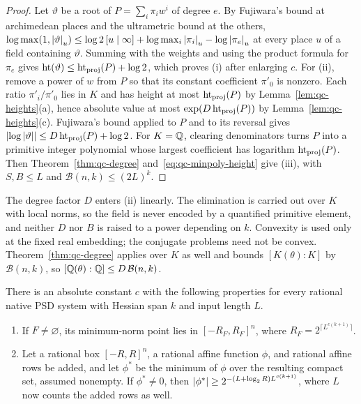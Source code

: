 \begin{proof}
Let $\vartheta$ be a root of $P=\sum_i\pi_iw^i$ of degree $e$. By Fujiwara's
bound at archimedean places and the ultrametric bound at the others,
$\log\max(1,\left\lvert\vartheta\right\rvert_u)\le\log2\,[u\mid\infty]+
\log\max_i\left\lvert\pi_i\right\rvert_u-\log\left\lvert\pi_e\right\rvert_u$ at every place $u$ of a field
containing $\vartheta$. Summing with the weights and using the product formula
for $\pi_e$ gives $\operatorname{ht}(\vartheta)\le\operatorname{ht}_{\rm proj}(P)+\log2$, which
proves (i) after enlarging $c$. For (ii), remove a power of $w$ from $P$ so
that its constant coefficient $\pi'_0$ is nonzero. Each ratio $\pi'_i/\pi'_0$ lies
in $K$ and has height at most $\operatorname{ht}_{\rm proj}(P)$ by
Lemma~\ref{lem:qc-heights}(a), hence absolute value at most
$\exp(D\operatorname{ht}_{\rm proj}(P))$ by Lemma~\ref{lem:qc-heights}(c). Fujiwara's
bound applied to $P$ and to its reversal gives
$\left\lvert\log\left\lvert\vartheta\right\rvert\right\rvert\le D\operatorname{ht}_{\rm proj}(P)+\log2$. For $K=\mathbb Q$,
clearing denominators turns $P$ into a primitive integer polynomial whose
largest coefficient has logarithm $\operatorname{ht}_{\rm proj}(P)$. Then
Theorem~\ref{thm:qc-degree} and~\eqref{eq:qc-minpoly-height} give (iii), with
$S,B\le L$ and $\mathcal B(n,k)\le(2L)^k$.
\end{proof}

The degree factor $D$ enters (ii) linearly. The elimination is carried out
over $K$ with local norms, so the field is never encoded by a quantified
primitive element, and neither $D$ nor $B$ is raised to a power depending on
$k$. Convexity is used only at the fixed real embedding; the conjugate
problems need not be convex. Theorem~\ref{thm:qc-degree} applies over $K$ as
well and bounds $[K(\theta):K]$ by $\mathcal B(n,k)$, so
$[\mathbb Q(\theta):\mathbb Q]\le D\,\mathcal B(n,k)$.

\begin{corollary}
\label{cor:qc-radius}
There is an absolute constant $c$ with the following properties for every
rational native PSD system with Hessian span $k$ and input length $L$.
\begin{enumerate}[label=(\alph*),leftmargin=*]
\item If $F\ne\varnothing$, its minimum-norm point lies in $[-R_F,R_F]^n$,
where $R_F=2^{\lceil L^{c(k+1)}\rceil}$.
\item Let a rational box $[-R,R]^n$, a rational affine function $\phi$, and
rational affine rows be added, and let $\phi^*$ be the minimum of $\phi$ over
the resulting compact set, assumed nonempty. If $\phi^*\ne0$, then
$\left\lvert\phi^*\right\rvert\ge2^{-(L+\log_2R)L^{c(k+1)}}$, where $L$ now counts the added
rows as well.
\end{enumerate}
\end{corollary}

